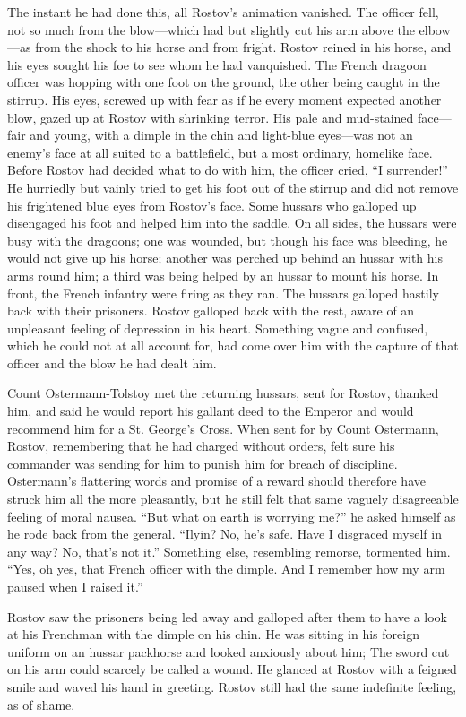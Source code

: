The instant he had done this, all Rostov's animation
vanished. The officer fell, not so much from the blow---which had
but slightly cut his arm above the elbow---as from the shock to
his horse and from fright.  Rostov reined in his horse, and his
eyes sought his foe to see whom he had vanquished. The French
dragoon officer was hopping with one foot on the ground, the
other being caught in the stirrup. His eyes, screwed up with fear
as if he every moment expected another blow, gazed up at Rostov
with shrinking terror. His pale and mud-stained face---fair and
young, with a dimple in the chin and light-blue eyes---was not an
enemy's face at all suited to a battlefield, but a most ordinary,
homelike face.  Before Rostov had decided what to do with him,
the officer cried, ``I surrender!'' He hurriedly but vainly tried
to get his foot out of the stirrup and did not remove his
frightened blue eyes from Rostov's face.  Some hussars who
galloped up disengaged his foot and helped him into the
saddle. On all sides, the hussars were busy with the dragoons;
one was wounded, but though his face was bleeding, he would not
give up his horse; another was perched up behind an hussar with
his arms round him; a third was being helped by an hussar to
mount his horse. In front, the French infantry were firing as
they ran. The hussars galloped hastily back with their
prisoners. Rostov galloped back with the rest, aware of an
unpleasant feeling of depression in his heart. Something vague
and confused, which he could not at all account for, had come
over him with the capture of that officer and the blow he had
dealt him.

Count Ostermann-Tolstoy met the returning hussars, sent for
Rostov, thanked him, and said he would report his gallant deed to
the Emperor and would recommend him for a St. George's
Cross. When sent for by Count Ostermann, Rostov, remembering that
he had charged without orders, felt sure his commander was
sending for him to punish him for breach of
discipline. Ostermann's flattering words and promise of a reward
should therefore have struck him all the more pleasantly, but he
still felt that same vaguely disagreeable feeling of moral
nausea. ``But what on earth is worrying me?'' he asked himself as
he rode back from the general. ``Ilyin? No, he's safe. Have I
disgraced myself in any way? No, that's not it.'' Something else,
resembling remorse, tormented him. ``Yes, oh yes, that French
officer with the dimple. And I remember how my arm paused when I
raised it.''

Rostov saw the prisoners being led away and galloped after them
to have a look at his Frenchman with the dimple on his chin. He
was sitting in his foreign uniform on an hussar packhorse and
looked anxiously about him; The sword cut on his arm could
scarcely be called a wound. He glanced at Rostov with a feigned
smile and waved his hand in greeting.  Rostov still had the same
indefinite feeling, as of shame.

